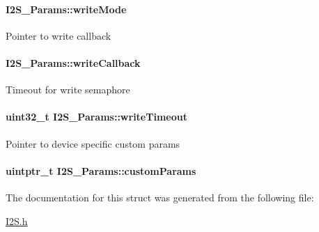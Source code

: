 \paragraph[{write\+Mode}]{ I2\+S\+\_\+\+Params\+::write\+Mode}\label{struct_i2_s___params_a51ab14d450552a917fbadd8c91418ec5}
Pointer to write callback 
\paragraph[{write\+Callback}]{ I2\+S\+\_\+\+Params\+::write\+Callback}\label{struct_i2_s___params_a2cf905e275e93a49707613aedcb2ab9b}
Timeout for write semaphore 
\paragraph[{write\+Timeout}]{\setlength{\rightskip}{0pt plus 5cm}uint32\+\_\+t I2\+S\+\_\+\+Params\+::write\+Timeout}\label{struct_i2_s___params_ae42c67f2e240e631a7d4944aa36e0050}
Pointer to device specific custom params 
\paragraph[{custom\+Params}]{\setlength{\rightskip}{0pt plus 5cm}uintptr\+\_\+t I2\+S\+\_\+\+Params\+::custom\+Params}\label{struct_i2_s___params_a7fb7c5969afa79e4b6678ac84c8c8d77}


The documentation for this struct was generated from the following file\+:\begin{DoxyCompactItemize}
\item 
\hyperlink{_i2_s_8h}{I2\+S.\+h}\end{DoxyCompactItemize}
